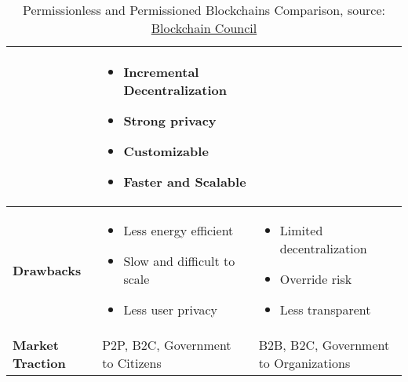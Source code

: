 \begin{table}[h]
\begin{tabular}{|l|p{5.5cm}|p{5.5cm}|}
\begin{itemize}
\end{itemize} 
& 
\begin{itemize}
  \item Incremental Decentralization
  \item Strong privacy
  \item Customizable
  \item Faster and Scalable
\end{itemize} \\
\hline
\textbf{Drawbacks} & 
\begin{itemize}
  \item Less energy efficient
  \item Slow and difficult to scale
  \item Less user privacy
\end{itemize} 
& 
\begin{itemize}
  \item Limited decentralization
  \item Override risk
  \item Less transparent
\end{itemize} \\
\hline
\textbf{Market Traction} & P2P, B2C, Government to Citizens & B2B, B2C, Government to Organizations \\
\hline
\end{tabular}
\captionsetup{justification=centering}
\caption{Permissionless and Permissioned Blockchains Comparison, source: \href{https://www.blockchain-council.org/blockchain/permissioned-and-permissionless-blockchains-a-comprehensive-guide/}{Blockchain Council}}\footnotemark{}
\label{tab:blockchain-comparison}
\end{table}


